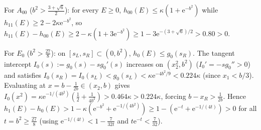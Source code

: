\documentclass{iopjournal}
\newcommand{\ee}{\mathrm{e}}
\begin{document}
For $A_{00}$ ($b^2 > \frac{3+\sqrt{6}}{2}$): for every $E \ge 0$, $h_{00}(E) \le \kappa(1+\ee^{-b^2})$ while $h_{11}(E) \ge 2 - 2\kappa\ee^{-b^2}$, so $h_{11}(E) - h_{00}(E) \ge 2 - \kappa(1 + 3\ee^{-b^2}) \ge 1 - 3\ee^{-(3+\sqrt{6})/2} > 0.80 > 0$.

For $E_0$ ($b^2 > \frac{27}{8}$): on $[s_L, s_R] \subset (0, b^2)$, $h_0(E) \le g_0(s_R)$. The tangent intercept $I_0(s) := g_0(s) - s g_0'(s)$ increases on $(x_2^2, b^2)$ ($I_0' = -s g_0'' > 0$) and satisfies $I_0(s_R) = I_0(s_L) < g_0(s_L) < \kappa\ee^{-4b^2/9} < 0.224\kappa$ (since $x_1 < b/3$). Evaluating at $x = b - \frac{1}{2b} \in (x_2, b)$ gives $I_0(x^2) = \kappa\ee^{-1/(4b^2)}(\frac{1}{2} + \frac{1}{4b^2}) > 0.464\kappa > 0.224\kappa$, forcing $b - x_R > \frac{1}{2b}$. Hence $h_1(E) - h_0(E) > 1 - \kappa(\ee^{-b^2} + \ee^{-1/(4b^2)}) \ge 1 - (\ee^{-t} + \ee^{-1/(4t)}) > 0$ for all $t = b^2 \ge \frac{27}{8}$ (using $\ee^{-1/(4t)} < 1 - \frac{7}{32t}$ and $t\ee^{-t} < \frac{7}{32}$).
\end{document}
